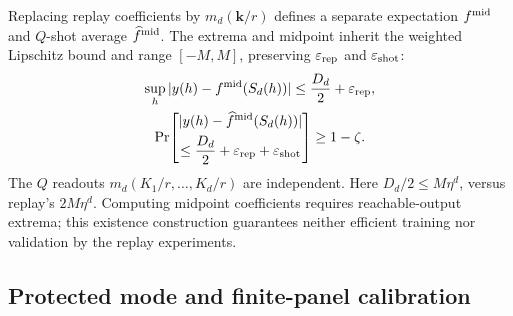 Replacing replay coefficients by $m_d(\boldsymbol k/r)$ defines a separate
expectation $f^{\rm mid}$ and $Q$-shot average $\widehat f^{\rm mid}$.
The extrema and midpoint inherit the weighted Lipschitz bound and range
$[-M,M]$, preserving $\varepsilon_{\rm rep}$ and $\varepsilon_{\rm shot}$:
\begin{equation}
 \begin{gathered}
 \sup_h|y(h)-f^{\rm mid}(S_d(h))|
 \leq\frac{D_d}{2}+\varepsilon_{\rm rep},\\
 \Pr\!\left[
 \begin{gathered}
 |y(h)-\widehat f^{\rm mid}(S_d(h))|
 \\
 \leq\frac{D_d}{2}+\varepsilon_{\rm rep}+\varepsilon_{\rm shot}
 \end{gathered}
 \right]\geq1-\zeta .
 \end{gathered}
 \label{eq:midpoint-resource-bound}
\end{equation}
The $Q$ readouts $m_d(K_1/r,\ldots,K_d/r)$ are independent.
Here $D_d/2\leq M\eta^d$, versus replay's $2M\eta^d$.
Computing midpoint coefficients requires reachable-output extrema;
this existence construction guarantees neither efficient training nor
validation by the replay experiments.

\subsection{Protected mode and finite-panel calibration}
\label{app:protected-calibration}

